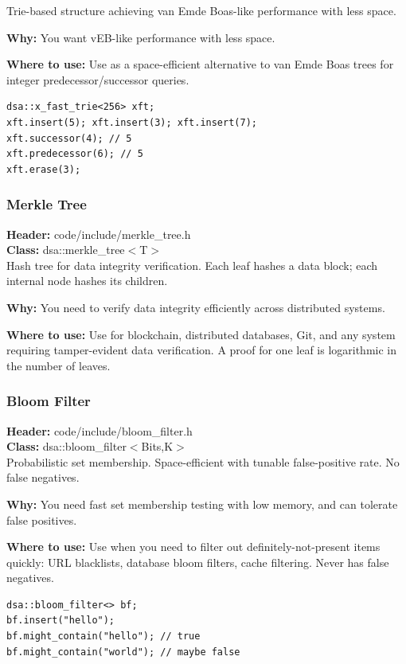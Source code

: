 \documentclass[11pt]{article}
\begin{document}
Trie-based structure achieving van Emde Boas-like performance with less space.

\textbf{Why:} You want vEB-like performance with less space. \par \textbf{Where to use:} Use as a space-efficient alternative to van Emde Boas trees for integer predecessor/successor queries.

\begin{lstlisting}
dsa::x_fast_trie<256> xft;
xft.insert(5); xft.insert(3); xft.insert(7);
xft.successor(4); // 5
xft.predecessor(6); // 5
xft.erase(3);
\end{lstlisting}

\subsubsection{Merkle Tree}
\textbf{Header:} code/include/merkle\_tree.h\\
\textbf{Class:} dsa::merkle\_tree$<$T$>$\\

Hash tree for data integrity verification. Each leaf hashes a data block; each internal node hashes its children.

\textbf{Why:} You need to verify data integrity efficiently across distributed systems. \par \textbf{Where to use:} Use for blockchain, distributed databases, Git, and any system requiring tamper-evident data verification. A proof for one leaf is logarithmic in the number of leaves.

\subsubsection{Bloom Filter}
\textbf{Header:} code/include/bloom\_filter.h\\
\textbf{Class:} dsa::bloom\_filter$<$Bits,K$>$\\

Probabilistic set membership. Space-efficient with tunable false-positive rate. No false negatives.

\textbf{Why:} You need fast set membership testing with low memory, and can tolerate false positives. \par \textbf{Where to use:} Use when you need to filter out definitely-not-present items quickly: URL blacklists, database bloom filters, cache filtering. Never has false negatives.

\begin{lstlisting}
dsa::bloom_filter<> bf;
bf.insert("hello");
bf.might_contain("hello"); // true
bf.might_contain("world"); // maybe false
\end{lstlisting}
\end{document}
